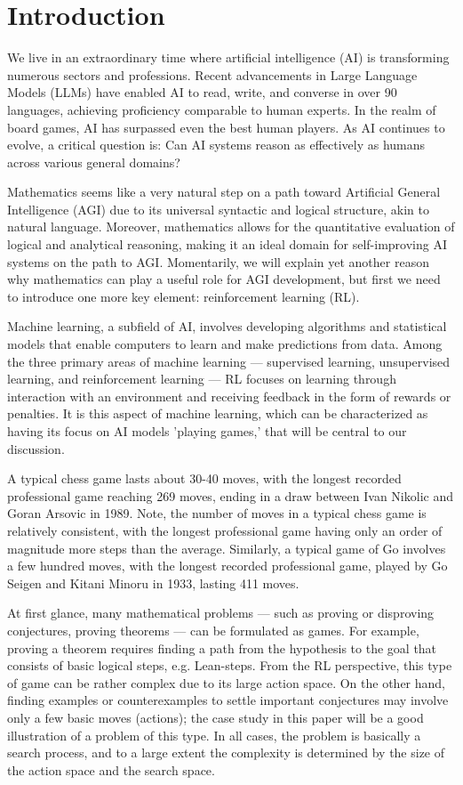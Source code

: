 
\section{Introduction\label{sec:intro}}

We live in an extraordinary time where artificial intelligence (AI) is transforming numerous sectors and professions. Recent advancements in Large Language Models (LLMs) have enabled AI to read, write, and converse in over 90 languages, achieving proficiency comparable to human experts. In the realm of board games, AI has surpassed even the best human players. As AI continues to evolve, a critical question is: Can AI systems reason as effectively as humans across various general domains?

Mathematics seems like a very natural step on a path toward Artificial General Intelligence (AGI) due to its universal syntactic and logical structure, akin to natural language. Moreover, mathematics allows for the quantitative evaluation of logical and analytical reasoning, making it an ideal domain for self-improving AI systems on the path to AGI. Momentarily, we will explain yet another reason why mathematics can play a useful role for AGI development, but first we need to introduce one more key element: reinforcement learning (RL).

Machine learning, a subfield of AI, involves developing algorithms and statistical models that enable computers to learn and make predictions from data. Among the three primary areas of machine learning --- supervised learning, unsupervised learning, and reinforcement learning --- RL focuses on learning through interaction with an environment and receiving feedback in the form of rewards or penalties. It is this aspect of machine learning, which can be characterized as having its focus on AI models 'playing games,' that will be central to our discussion.

A typical chess game lasts about 30-40 moves, with the longest recorded professional game reaching 269 moves, ending in a draw between Ivan Nikolic and Goran Arsovic in 1989. Note, the number of moves in a typical chess game is relatively consistent, with the longest professional game having only an order of magnitude more steps than the average. Similarly, a typical game of Go involves a few hundred moves, with the longest recorded professional game, played by Go Seigen and Kitani Minoru in 1933, lasting 411 moves.

At first glance, many mathematical problems --- such as proving or disproving conjectures, proving theorems --- can be formulated as games. For example, proving a theorem requires finding a path from the hypothesis to the goal that consists of basic logical steps, e.g. Lean-steps. From the RL perspective, this type of game can be rather complex due to its large action space. On the other hand, finding examples or counterexamples to settle important conjectures may involve only a few basic moves (actions); the case study in this paper will be a good illustration of a problem of this type. In all cases, the problem is basically a search process, and to a large extent the complexity is determined by the size of the action space and the search space.

